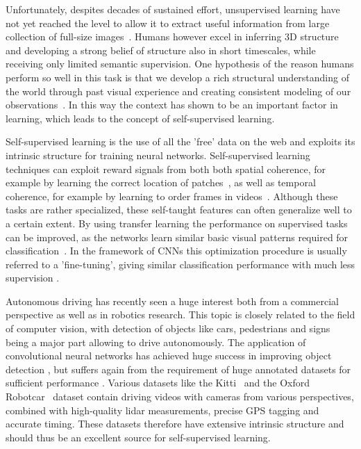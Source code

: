 Unfortunately, despites decades of sustained effort, unsupervised learning have not yet reached the level to allow it to extract useful information from large collection of full-size images~\cite{doersch2015}. Humans however excel in inferring 3D structure and developing a strong belief of structure also in short timescales, while receiving only limited semantic supervision. One hypothesis of the reason humans perform so well in this task is that we develop a rich structural understanding of the world through past visual experience and creating consistent modeling of our observations~\cite{zhou2017}. In this way the context has shown to be an important factor in learning, which leads to the concept of self-supervised learning.

Self-supervised learning is the use of all the 'free' data on the web and exploits its intrinsic structure for training neural networks. Self-supervised learning techniques can exploit reward signals from both both spatial coherence, for example by learning the correct location of patches~\cite{doersch2015, noroozi2016}, as well as temporal coherence, for example by learning to order frames in videos~\cite{misra2016, lee2017}. Although these tasks are rather specialized, these self-taught features can often generalize well to a certain extent. By using transfer learning the performance on supervised tasks can be improved, as the networks learn similar basic visual patterns required for classification~\cite{raina2007}. In the framework of CNNs this optimization procedure is usually referred to a 'fine-tuning', giving similar classification performance with much less supervision \needref.

Autonomous driving has recently seen a huge interest both from a commercial perspective as well as in robotics research. This topic is closely related to the field of computer vision, with detection of objects like cars, pedestrians and signs being a major part allowing to drive autonomously. The application of convolutional neural networks has achieved huge success in improving object detection \needref, but suffers again from the requirement of huge annotated datasets for sufficient performance \needref. Various datasets like the Kitti~\cite{geiger2012} and the Oxford Robotcar~\cite{maddern2017} dataset contain driving videos with cameras from various perspectives, combined with high-quality lidar measurements, precise GPS tagging and accurate timing. These datasets therefore have extensive intrinsic structure and should thus be an excellent source for self-supervised learning. 

